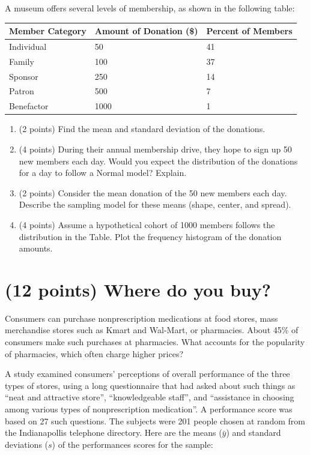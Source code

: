 \documentclass[letterpaper,12pt,twoside,]{pinp}
\providecommand{\tightlist}{%
  \setlength{\itemsep}{0pt}\setlength{\parskip}{0pt}}
\begin{document}
A museum offers several levels of membership, as shown in the following
table:

\begin{longtable}[]{@{}lll@{}}
\toprule
Member Category & Amount of Donation (\$) & Percent of
Members\tabularnewline
\midrule
\endhead
Individual & 50 & 41\tabularnewline
Family & 100 & 37\tabularnewline
Sponsor & 250 & 14\tabularnewline
Patron & 500 & 7\tabularnewline
Benefactor & 1000 & 1\tabularnewline
\bottomrule
\end{longtable}

\begin{enumerate}
\def\labelenumi{\alph{enumi}.}
\tightlist
\item
  (2 points) Find the mean and standard deviation of the donations.
\item
  (4 points) During their annual membership drive, they hope to sign up
  50 new members each day. Would you expect the distribution of the
  donations for a day to follow a Normal model? Explain.
\item
  (2 points) Consider the mean donation of the 50 new members each day.
  Describe the sampling model for these means (shape, center, and
  spread).
\item
  (4 points) Assume a hypothetical cohort of 1000 members follows the
  distribution in the Table. Plot the frequency histogram of the
  donation amounts.
\end{enumerate}

\hypertarget{points-where-do-you-buy}{%
\section{(12 points) Where do you buy?}\label{points-where-do-you-buy}}

Consumers can purchase nonprescription medications at food stores, mass
merchandise stores such as Kmart and Wal-Mart, or pharmacies. About 45\%
of consumers make such purchases at pharmacies. What accounts for the
popularity of pharmacies, which often charge higher prices?

A study examined consumers' perceptions of overall performance of the
three types of stores, using a long questionnaire that had asked about
such things as ``neat and attractive store'', ``knowledgeable staff'',
and ``assistance in choosing among various types of nonprescription
medication''. A performance score was based on 27 such questions. The
subjects were 201 people chosen at random from the Indianapollis
telephone directory. Here are the means (\(\bar{y}\)) and standard
deviations (\(s\)) of the performances scores for the sample:
\end{document}
